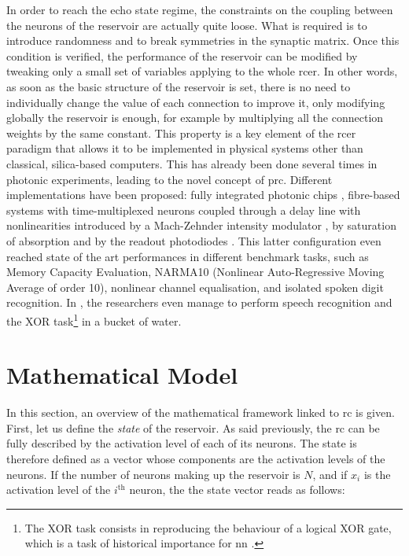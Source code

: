 In order to reach the echo state regime, the constraints on the coupling between the neurons of the reservoir are actually quite loose. What is required is to introduce randomness and to break symmetries in the synaptic matrix. Once this condition is verified, the performance of the reservoir can be modified by tweaking only a small set of variables applying to the whole \gls{rcer}. In other words, as soon as the basic structure of the reservoir is set, there is no need to individually change the value of each connection to improve it, only modifying globally the reservoir is enough, for example by multiplying all the connection weights by the same constant. This property is a key element of the \gls{rcer} paradigm that allows it to be implemented in physical systems other than classical, silica-based computers. This has already been done several times in photonic experiments, leading to the novel concept of \gls{prc}. Different implementations have been proposed: fully integrated photonic chips \cite{Vandoorne2014}, fibre-based systems with time-multiplexed neurons coupled through a delay line with nonlinearities introduced by a Mach-Zehnder intensity modulator \cite{Paquot2012, Antonik2017, Duport2016}, by saturation of absorption \cite{Dejonckheere2014, Vandoorne2008} and by the readout photodiodes \cite{Vinckier2015}. This latter configuration even reached state of the art performances in different benchmark tasks, such as Memory Capacity Evaluation, NARMA10 (Nonlinear Auto-Regressive Moving Average of order 10), nonlinear channel equalisation, and isolated spoken digit recognition. In \cite{Fernando2003}, the researchers even manage to perform speech recognition and the XOR task\footnote{The XOR task consists in reproducing the behaviour of a logical XOR gate, which is a task of historical importance for \gls{nn} \cite{minsky1969perceptrons}.} in a bucket of water. 

\section{Mathematical Model}

In this section, an overview of the mathematical framework linked to \gls{rc} is given. First, let us define the \textit{state} of the reservoir. As said previously, the \gls{rc} can be fully described by the activation level of each of its neurons. The state is therefore defined as a vector whose components are the activation levels of the neurons. If the number of neurons making up the reservoir is $N$, and if $x_i$ is the activation level of the $i^{\text{th}}$ neuron, the the state vector reads as follows:

